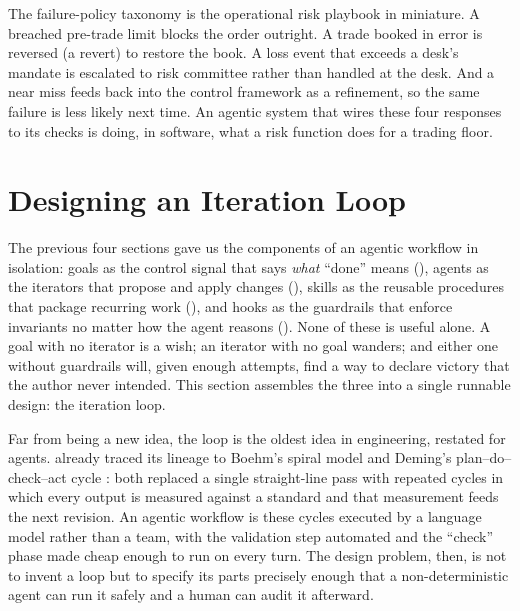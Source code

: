 \begin{context}
The failure-policy taxonomy is the operational risk playbook in miniature. A breached pre-trade limit blocks the order outright. A trade booked in error is reversed (a revert) to restore the book. A loss event that exceeds a desk's mandate is escalated to risk committee rather than handled at the desk. And a near miss feeds back into the control framework as a refinement, so the same failure is less likely next time. An agentic system that wires these four responses to its checks is doing, in software, what a risk function does for a trading floor.
\end{context}

\section{Designing an Iteration Loop}\label{sec:designing-loop}

The previous four sections gave us the components of an agentic workflow in
isolation: goals as the control signal that says \emph{what} ``done'' means
(), agents as the iterators that propose and apply
changes (), skills as the reusable procedures that
package recurring work (), and hooks as the
guardrails that enforce invariants no matter how the agent reasons
().
None of these is useful alone. A goal with no iterator is a wish; an iterator
with no goal wanders; and either one without guardrails will, given enough
attempts, find a way to declare victory that the author never intended. This
section assembles the three into a single runnable design: the iteration loop.

Far from being a new idea, the loop is the oldest idea in engineering, restated for
agents.  already traced its lineage to Boehm's
spiral model \cite{boehm1988spiral} and Deming's plan--do--check--act cycle
\cite{deming1986}: both replaced a single straight-line pass with repeated cycles
in which every output is measured against a standard and that measurement feeds
the next revision. An agentic workflow is these cycles executed by a language
model rather than a team, with the validation step automated and the ``check''
phase made cheap enough to run on every turn. The
design problem, then, is not to invent a loop but to specify its parts precisely
enough that a non-deterministic agent can run it safely and a human can audit it
afterward.


